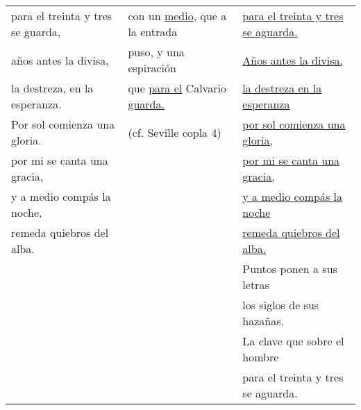 \documentclass[class=vcbook,preview]{standalone}
\def\strophe{\hspace{1em}}
\begin{document}
\begin{tabular}{lll}
    para el treinta y tres se guarda,
    & con un \uline{medio}, que a la entrada &
    \uline{para el treinta y tres se aguarda.} \\

    años antes la divisa,
    & puso, y una espiración & 
    \strophe{} \uline{Años antes la divisa,} \\

    la destreza, en la esperanza.
    & que \uline{para el} Calvario \uline{guarda.} & 
    \uline{la destreza en la esperanza} \\

    \strophe{} Por sol comienza una gloria. & 
    (cf. Seville copla 4) & 
    \uline{por sol comienza una gloria,} \\

    por mi se canta una gracia, &
    &
    \uline{por mi se canta una gracia,} \\

    y a medio compás la noche, &
    &
    \uline{y a medio compás la noche} \\

    remeda quiebros del alba. &
    &
    \uline{remeda quiebros del alba.} \\
  
    & &
    \strophe{} Puntos ponen a sus letras \\
   
    & & 
    los siglos de sus hazañas. \\

    & & 
    La clave que sobre el hombre \\

    & & 
    para el treinta y tres se aguarda. \\
    \bottomrule
\end{tabular}
\end{document}
